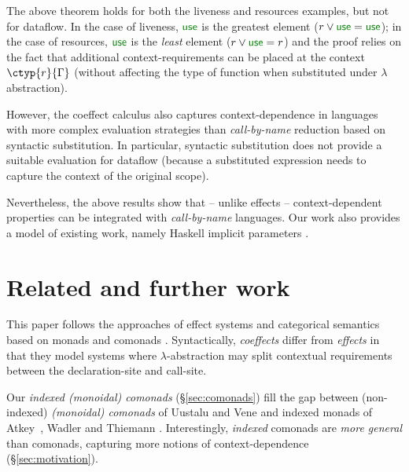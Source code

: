 The above theorem holds for both the liveness and resources examples,
but not for dataflow.  In the case of liveness, $\cunit$ is the
greatest element ($r \vee \cunit = \cunit$); in the case of
resources, $\cunit$ is the \emph{least} element ($r \vee \cunit =
r$) and the proof relies on the fact that additional
context-requirements can be placed at the context $\ctyp{r}{\Gamma}$
(without affecting the type of function when substituted under
$\lambda$ abstraction).

However, the coeffect calculus also captures context-dependence in
languages with more complex evaluation strategies than
\emph{call-by-name} reduction based on syntactic substitution.  In
particular, syntactic substitution does not provide a suitable evaluation
for dataflow (because a substituted expression needs to capture the
context of the original scope).

Nevertheless, the above results show that -- unlike effects --
context-dependent properties can be integrated with
\emph{call-by-name} languages. Our work also provides a model of
existing work, namely Haskell implicit parameters
\cite{app-implicit-parameters}.


\section{Related and further work}
\label{sec:related}

This paper follows the approaches of effect systems \cite{effects-gifford,effects-talpin-et-al,monads-effects-marriage}
and categorical semantics based on monads and comonads \cite{monad-notions,comonads-notions}. Syntactically,
\emph{coeffects} differ from \emph{effects} in that they model systems where $\lambda$-abstraction 
may split contextual requirements between the declaration-site and call-site.

Our \emph{indexed (monoidal) comonads} (\S\ref{sec:comonads}) fill the gap between (non-indexed)
\emph{(monoidal) comonads} of Uustalu and Vene \cite{comonads-notions}
and indexed monads of Atkey~\cite{monads-parameterised-notions}, Wadler and Thiemann
\cite{monads-effects-marriage}. Interestingly, \emph{indexed} comonads are \emph{more
general} than comonads, capturing more notions of context-dependence (\S\ref{sec:motivation}).



